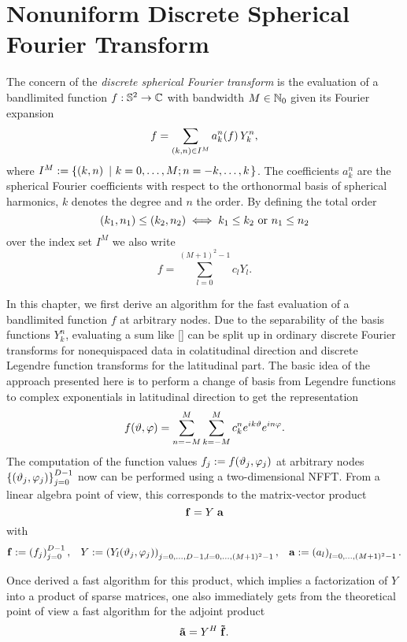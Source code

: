 \chapter{Nonuniform Discrete Spherical Fourier Transform}
\label{DSFT}

The concern of the \emph{discrete spherical Fourier transform}  
is the evaluation of a bandlimited function $f: \mathbb{S}^2 \rightarrow \mathbb{C}$ with bandwidth $M \in \mathbb{N}_{0}$ given its Fourier expansion
$$ f = \sum_{\left(k,n\right) \in I^M} a_k^n{\hspace{-0.4ex}}\left(f\right) Y_{k}^n,$$
where $I^M := \left\{\left(k,n\right)\ \left|\ k=0,\ldots,M;n=-k,\ldots,k\right.\right\rbrace$. The coefficients $a_k^n$ are the spherical Fourier coefficients 
with respect to the orthonormal basis of spherical harmonics, $k$ denotes the degree and $n$ the order. 
By defining the total order $$ \left(k_1,n_1\right) \le \left(k_2,n_2\right) \iff k_1 \le k_2 \text{ or } n_1 \le n_2 $$ 
over the index set $I^M$ we 
also write $$ f = \sum_{l=0}^{(M+1)^2-1} c_l Y_l.$$

In this chapter, we first derive an algorithm for the fast evaluation of a bandlimited function $f$ at arbitrary nodes. Due to the separability 
of the basis functions $Y_k^n$, evaluating a sum like \eqref{} can be split up in ordinary discrete Fourier transforms for nonequispaced 
data in colatitudinal direction and discrete Legendre function transforms for the latitudinal part. The basic idea of the approach 
presented here is to perform a change of basis from Legendre functions to complex exponentials in latitudinal direction to get the 
representation
$$ f{\hspace{-0.4ex}}\left(\vartheta,\varphi\right) = \sum_{n=-M}^{M} \sum_{k=-M}^M c_k^n e^{ik\vartheta} e^{in\varphi}.$$
The computation of the function values $f_j := f{\hspace{-0.4ex}}\left(\vartheta_j,\varphi_j\right)$ at arbitrary nodes 
$\left\{\left(\vartheta_j,\varphi_j\right)\right\rbrace_{j=0}^{D-1}$ now can be performed using a two-dimensional NFFT. 
From a linear algebra point of view, this corresponds to the matrix-vector product
$$ \mathbf{f} = Y \; \mathbf{a}$$
with
\begin{align}
  \nonumber
  \mathbf{f} & := \left(f_j\right)_{j=0}^{D-1}, & Y & := \left(Y_l{\hspace{-0.4ex}}\left(\vartheta_j,\varphi_j\right)\right)_{j=0,\ldots,D-1, l=0,\ldots,(M+1)^2-1}, & \mathbf{a} := \left(a_l\right)_{l=0,\ldots,(M+1)^2-1}.
\end{align}

Once derived a fast algorithm for this product, which implies a factorization of $Y$ into a product of sparse matrices,
one also immediately gets from the theoretical point of view a fast algorithm for the adjoint product $$\mathbf{\tilde{a}} = Y^H \; \mathbf{\tilde{f}}.$$


